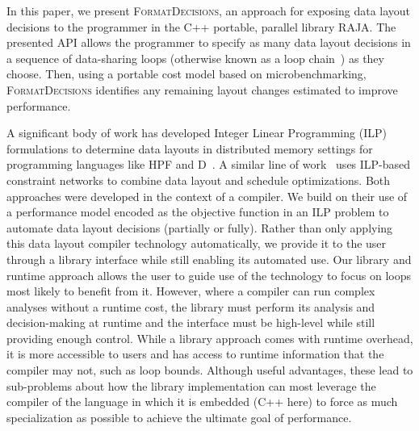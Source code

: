 \documentclass[sigconf,review=true]{acmart}
\newcommand{\FormatDecisions}[0]{{\textsc{FormatDecisions}}}
\begin{document}
In this paper, we present \FormatDecisions{}, an approach for exposing data layout decisions to the programmer in the C++ portable, parallel library RAJA.
The presented API allows the programmer to specify as many data layout decisions in a sequence of data-sharing loops (otherwise known as a loop chain~\cite{krieger2013loop}) as they choose.
Then, using a portable cost model based on microbenchmarking, \FormatDecisions{} identifies any remaining layout changes estimated to improve performance. 

A significant body of work has developed Integer Linear Programming (ILP) formulations to determine data layouts in distributed memory settings for programming languages like HPF and D~\cite{bixby1994automatic,kennedy1995automatic,kennedy1998automatic}. 
A similar line of work~\cite{chen2004ilp,chen2005constraint,chen2005integrating, ozturk2011data} uses ILP-based constraint networks to combine data layout and schedule optimizations. 
Both approaches were developed in the context of a compiler. 
We build on their use of a performance model encoded as the objective function in an ILP problem to automate data layout decisions (partially or fully).
Rather than only applying this data layout compiler technology automatically, we provide it to the user through a library interface while still enabling its automated use.
Our library and runtime approach allows the user to guide use of the technology to focus on loops most likely to benefit from it.
However, where a compiler can run complex analyses without a runtime cost, the library must perform its analysis and decision-making at runtime and the interface must be high-level while still providing enough control. 
While a library approach comes with runtime overhead, it is more accessible to users and has access to runtime information that the compiler may not, such as loop bounds.
Although useful advantages, these lead to sub-problems about how the library implementation can most leverage the compiler of the language in which it is embedded (C++ here) to force as much specialization as possible to achieve the ultimate goal of performance.

 
\end{document}
